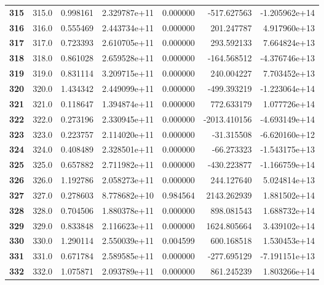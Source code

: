 \documentclass{report}[12pt]
\begin{document}
\begin{center}
\begin{tabular}{lrrrrrr}
\textbf{315 } &          315.0 &   0.998161 &  2.329787e+11 &    0.000000 &  -517.627563 & -1.205962e+14 \\
\textbf{316 } &          316.0 &   0.555469 &  2.443734e+11 &    0.000000 &   201.247787 &  4.917960e+13 \\
\textbf{317 } &          317.0 &   0.723393 &  2.610705e+11 &    0.000000 &   293.592133 &  7.664824e+13 \\
\textbf{318 } &          318.0 &   0.861028 &  2.659528e+11 &    0.000000 &  -164.568512 & -4.376746e+13 \\
\textbf{319 } &          319.0 &   0.831114 &  3.209715e+11 &    0.000000 &   240.004227 &  7.703452e+13 \\
\textbf{320 } &          320.0 &   1.434342 &  2.449099e+11 &    0.000000 &  -499.393219 & -1.223064e+14 \\
\textbf{321 } &          321.0 &   0.118647 &  1.394874e+11 &    0.000000 &   772.633179 &  1.077726e+14 \\
\textbf{322 } &          322.0 &   0.273196 &  2.330945e+11 &    0.000000 & -2013.410156 & -4.693149e+14 \\
\textbf{323 } &          323.0 &   0.223757 &  2.114020e+11 &    0.000000 &   -31.315508 & -6.620160e+12 \\
\textbf{324 } &          324.0 &   0.408489 &  2.328501e+11 &    0.000000 &   -66.273323 & -1.543175e+13 \\
\textbf{325 } &          325.0 &   0.657882 &  2.711982e+11 &    0.000000 &  -430.223877 & -1.166759e+14 \\
\textbf{326 } &          326.0 &   1.192786 &  2.058273e+11 &    0.000000 &   244.127640 &  5.024814e+13 \\
\textbf{327 } &          327.0 &   0.278603 &  8.778682e+10 &    0.984564 &  2143.262939 &  1.881502e+14 \\
\textbf{328 } &          328.0 &   0.704506 &  1.880378e+11 &    0.000000 &   898.081543 &  1.688732e+14 \\
\textbf{329 } &          329.0 &   0.833848 &  2.116623e+11 &    0.000000 &  1624.805664 &  3.439102e+14 \\
\textbf{330 } &          330.0 &   1.290114 &  2.550039e+11 &    0.004599 &   600.168518 &  1.530453e+14 \\
\textbf{331 } &          331.0 &   0.671784 &  2.589585e+11 &    0.000000 &  -277.695129 & -7.191151e+13 \\
\textbf{332 } &          332.0 &   1.075871 &  2.093789e+11 &    0.000000 &   861.245239 &  1.803266e+14 \\

\end{tabular}
\end{center}
\end{document}
